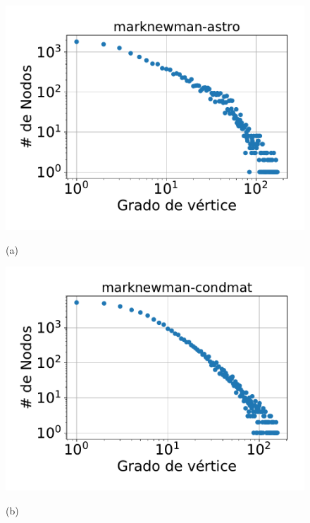 \begin{figure}
    \centering
    	\begin{minipage}{1\textwidth}
    		\centering
    		\begin{minipage}{0.45\textwidth}
    			\centering
    			\includegraphics[width=1\linewidth]{img/grades/marknewman-astro.pdf}
    			
    			(a)
    		\end{minipage}
    		\begin{minipage}{0.45\textwidth}
    			\centering
    			\includegraphics[width=1\linewidth]{img/grades/marknewman-condmat.pdf}
    			
    			(b)
    		\end{minipage}  		
    	\end{minipage}
    	

\end{figure}
